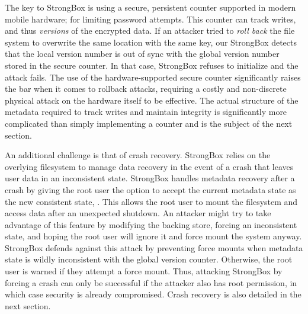 The key to StrongBox is using a secure, persistent counter supported in modern
mobile hardware; \eg for limiting password attempts. This counter can track
writes, and thus \emph{versions} of the encrypted data. If an attacker tried to
\emph{roll back} the file system to overwrite the same location with the same
key, our StrongBox detects that the local version number is out of sync with the
global version number stored in the secure counter. In that case, StrongBox
refuses to initialize and the attack fails. The use of the hardware-supported
secure counter significantly raises the bar when it comes to rollback attacks,
requiring a costly and non-discrete physical attack on the hardware itself to be
effective. The actual structure of the metadata required to track writes and
maintain integrity is significantly more complicated than simply implementing a
counter and is the subject of the next section.

An additional challenge is that of crash recovery. StrongBox relies on the
overlying filesystem to manage data recovery in the event of a crash that leaves
user data in an inconsistent state. StrongBox handles metadata recovery after a
crash by giving the root user the option to accept the current metadata state as
the new consistent state, . This allows the root user to
mount the filesystem and access data after an unexpected shutdown. An attacker
might try to take advantage of this feature by modifying the backing store,
forcing an inconsistent state, and hoping the root user will ignore it and force
mount the system anyway. StrongBox defends against this attack by preventing
force mounts when metadata state is wildly inconsistent with the global version
counter. Otherwise, the root user is warned if they attempt a force mount. Thus,
attacking StrongBox by forcing a crash can only be successful if the attacker
also has root permission, in which case security is already compromised. Crash
recovery is also detailed in the next section.

